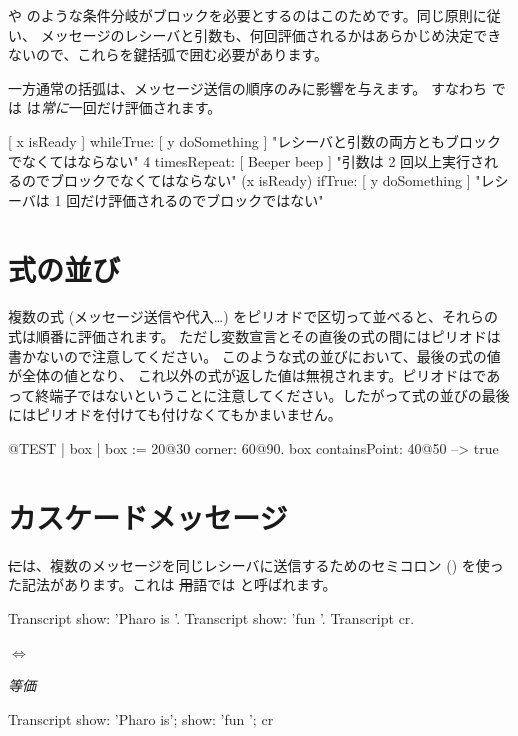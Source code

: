 \documentclass[a4paper,10pt,twoside]{book}
\begin{document}
 や  のような条件分岐がブロックを必要とするのはこのためです。同じ原則に従い、 メッセージのレシーバと引数も、何回評価されるかはあらかじめ決定できないので、これらを鍵括弧で囲む必要があります。

一方通常の括弧は、メッセージ送信の順序のみに影響を与えます。
すなわち  では  は\emph{常に}一回だけ評価されます。

\begin{code}{}
[ x isReady ] whileTrue: [ y doSomething ]   "レシーバと引数の両方ともブロックでなくてはならない"
4 timesRepeat: [ Beeper beep ]                   "引数は 2 回以上実行されるのでブロックでなくてはならない"
(x isReady) ifTrue: [ y doSomething ]           "レシーバは 1 回だけ評価されるのでブロックではない"
\end{code}

\section{式の並び}
複数の式 (\ie メッセージ送信や代入\dots) をピリオドで区切って並べると、それらの式は順番に評価されます。
ただし変数宣言とその直後の式の間にはピリオドは書かないので注意してください。
このような式の並びにおいて、最後の式の値が全体の値となり、
これ以外の式が返した値は無視されます。ピリオドはであって終端子ではないということに注意してください。したがって式の並びの最後にはピリオドを付けても付けなくてもかまいません。

\begin{code}{@TEST}
| box |
box := 20@30 corner: 60@90.
box containsPoint: 40@50 --> true
\end{code}

\section{カスケードメッセージ}
\st には、複数のメッセージを同じレシーバに送信するためのセミコロン (\ct{;}) を使った記法があります。これは \st 用語では  と呼ばれます。


\begin{minipage}{0.35\textwidth}
\begin{code}{}
Transcript show: 'Pharo is '.
Transcript show: 'fun '.
Transcript cr.
\end{code}
\end{minipage}
\begin{minipage}{0.15\textwidth}
\begin{center}
$\Longleftrightarrow$

\emph{等価}
\end{center}
\end{minipage}
\begin{minipage}{0.35\textwidth}
\begin{code}{}
Transcript        
   show: 'Pharo is';
   show: 'fun ';
   cr
\end{code}
\end{minipage}
\end{document}
